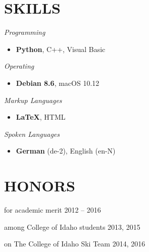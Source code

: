 \documentclass[margin]{res}
\newcommand\cs[1]{\textsl{#1} }
\newenvironment{details}{\begin{itemize}[itemsep=0.6pt,topsep=2.2pt] }{\end{itemize} }
\begin{document}
\begin{resume}
\section{SKILLS}
\vspace{0pt}
\begin{multicols}{2}
	\parskip=0pt
    \cs{Programming}
        	\begin{details}
            	\item \textbf{Python}, C++, Visual Basic
            \end{details}
    \cs{Operating}
        	\begin{details}
            	\item \textbf{Debian 8.6}, macOS 10.12
            \end{details}    \cs{Markup Languages} 
        	\begin{details}
            	\item \textbf{\LaTeX}, HTML
            \end{details}
    \cs{Spoken Languages}
    		\begin{details}
            	\item \textbf{German} (de-2), English (en-N)
        	\end{details}
\end{multicols}

\section{HONORS} 
\vspace{10pt}
	\begin{description}[noitemsep,topsep=0pt]
		\item[Heritage Scholarship] for academic merit \hfill 2012 -- 2016
    	\item[Top Putnam Score] among College of Idaho students \hfill 2013, 2015
        \item[Varsity Skier] on The College of Idaho Ski Team \hfill 2014, 2016
	\end{description}

\end{resume}
\end{document}
